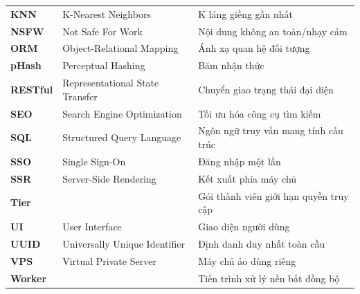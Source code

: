 \begin{longtable}{p{} p{} p{}}
\textbf{KNN} & K-Nearest Neighbors & K láng giềng gần nhất \\
\textbf{NSFW} & Not Safe For Work & Nội dung không an toàn/nhạy cảm \\
\textbf{ORM} & Object-Relational Mapping & Ánh xạ quan hệ đối tượng \\
\textbf{pHash} & Perceptual Hashing & Băm nhận thức \\
\textbf{RESTful} & Representational State Transfer & Chuyển giao trạng thái đại diện \\
\textbf{SEO} & Search Engine Optimization & Tối ưu hóa công cụ tìm kiếm \\
\textbf{SQL} & Structured Query Language & Ngôn ngữ truy vấn mang tính cấu trúc \\
\textbf{SSO} & Single Sign-On & Đăng nhập một lần \\
\textbf{SSR} & Server-Side Rendering & Kết xuất phía máy chủ \\
\textbf{Tier} & & Gói thành viên giới hạn quyền truy cập \\
\textbf{UI} & User Interface & Giao diện người dùng \\
\textbf{UUID} & Universally Unique Identifier & Định danh duy nhất toàn cầu \\
\textbf{VPS} & Virtual Private Server & Máy chủ ảo dùng riêng \\
\textbf{Worker} & & Tiến trình xử lý nền bất đồng bộ \\
\end{longtable}